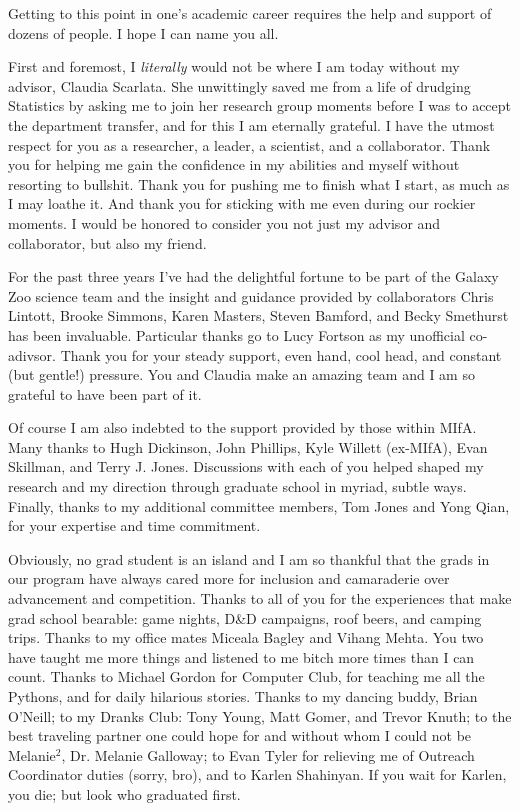 

Getting to this point in one's academic career requires the help and support of dozens of people. I hope I can name you all. %

First and foremost, I \textit{literally} would not be where I am today without my advisor, Claudia Scarlata. She unwittingly saved me from a life of drudging Statistics by asking me to join her research group moments before I was to accept the department transfer, and for this I am eternally grateful. I have the utmost respect for you as a researcher, a leader, a scientist, and a collaborator. Thank you for helping me gain the confidence in my abilities and myself without resorting to bullshit. Thank you for pushing me to finish what I start, as much as I may loathe it. And thank you for sticking with me even during our rockier moments. I would be honored to consider you not just my advisor and collaborator, but also my friend. 


For the past three years I've had the delightful fortune to be part of the Galaxy Zoo science team and the insight and guidance provided by collaborators Chris Lintott, Brooke Simmons, Karen Masters, Steven Bamford, and Becky Smethurst has been invaluable. Particular thanks go to Lucy Fortson as my unofficial co-adivsor. Thank you for your steady support, even hand, cool head, and constant (but gentle!) pressure.  You and Claudia make an amazing team and I am so grateful to have been part of it. 

Of course I am also indebted to the support provided by those within MIfA. Many thanks to Hugh Dickinson, John Phillips, Kyle Willett (ex-MIfA), Evan Skillman, and Terry J. Jones. Discussions with each of you helped shaped my research and my direction through graduate school in myriad, subtle ways. Finally, thanks to my additional committee members, Tom Jones and Yong Qian, for your expertise and time commitment. 


Obviously, no grad student is an island and I am so thankful that the grads in our program have always cared more for inclusion and camaraderie over advancement and competition. Thanks to all of you for the experiences that make grad school bearable: game nights, D\&D campaigns, roof beers, and camping trips. Thanks to my office mates Miceala Bagley and Vihang Mehta. You two have taught me more things and listened to me bitch more times than I can count. Thanks to Michael Gordon for Computer Club, for teaching me all the Pythons, and for daily hilarious stories. Thanks to my dancing buddy, Brian O'Neill; to my Dranks Club: Tony Young, Matt Gomer, and Trevor Knuth; to the best traveling partner one could hope for and without whom I could not be Melanie$^2$, Dr. Melanie Galloway; to Evan Tyler for relieving me of Outreach Coordinator duties (sorry, bro), and to Karlen Shahinyan. If you wait for Karlen, you die; but look who graduated first. 


